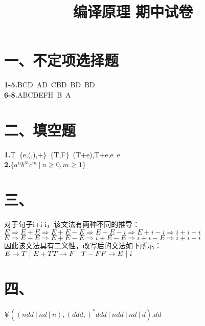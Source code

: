 \documentclass{article}
\title{编译原理 期中试卷}
\author{}
\date{}
\begin{document}
\section*{一、不定项选择题}
\noindent
\textbf{1-5.}BCD\ AD\ CBD\ BD\ BD\\
\textbf{6-8.}ABCDEFH\ B\ A
\section*{二、填空题}
\noindent
\textbf{1.}T\ \{e,(,),+\}\ \{T,F\}\ (T+e),T+e,e\ e\\
\textbf{2.}$\{a^nb^mc^m\ |\ n\geq 0,m\geq 1\}$
\section*{三、}
\noindent
对于句子i+i-i，该文法有两种不同的推导：\\
$E\Rightarrow E+E\Rightarrow E+E-E\Rightarrow E+E-i\Rightarrow E+i-i\Rightarrow i+i-i$\\
$E\Rightarrow E-E\Rightarrow E+E-E\Rightarrow i+E-E\Rightarrow i+i-E\Rightarrow i+i-i$\\
因此该文法具有二义性，改写后的文法如下所示：\\
$E\rightarrow T\ |\ E+T\\
T\rightarrow F\ |\ T-F\\
F\rightarrow E\ |\ i$
\section*{四、}
\noindent
$¥((ndd\ |\ nd\ |\ n),(ddd,)^*ddd\ |\ ndd\ |\ nd \ |\ d).dd$
\end{document}
